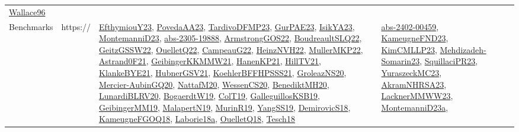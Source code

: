 {\begin{longtable}{llp{6cm}p{6cm}p{6cm}}
\href{articles/Wallace96.pdf}{Wallace96}\cite{Wallace96}\\
Benchmarks & https:// & \href{papers/EfthymiouY23.pdf}{EfthymiouY23}\cite{EfthymiouY23}, \href{papers/PovedaAA23.pdf}{PovedaAA23}\cite{PovedaAA23}, \href{papers/TardivoDFMP23.pdf}{TardivoDFMP23}\cite{TardivoDFMP23}, \href{articles/GurPAE23.pdf}{GurPAE23}\cite{GurPAE23}, \href{articles/IsikYA23.pdf}{IsikYA23}\cite{IsikYA23}, \href{articles/MontemanniD23.pdf}{MontemanniD23}\cite{MontemanniD23}, \href{articles/abs-2305-19888.pdf}{abs-2305-19888}\cite{abs-2305-19888}, \href{papers/ArmstrongGOS22.pdf}{ArmstrongGOS22}\cite{ArmstrongGOS22}, \href{papers/BoudreaultSLQ22.pdf}{BoudreaultSLQ22}\cite{BoudreaultSLQ22}, \href{papers/GeitzGSSW22.pdf}{GeitzGSSW22}\cite{GeitzGSSW22}, \href{papers/OuelletQ22.pdf}{OuelletQ22}\cite{OuelletQ22}, \href{articles/CampeauG22.pdf}{CampeauG22}\cite{CampeauG22}, \href{articles/HeinzNVH22.pdf}{HeinzNVH22}\cite{HeinzNVH22}, \href{articles/MullerMKP22.pdf}{MullerMKP22}\cite{MullerMKP22}, \href{papers/Astrand0F21.pdf}{Astrand0F21}\cite{Astrand0F21}, \href{papers/GeibingerKKMMW21.pdf}{GeibingerKKMMW21}\cite{GeibingerKKMMW21}, \href{papers/HanenKP21.pdf}{HanenKP21}\cite{HanenKP21}, \href{papers/HillTV21.pdf}{HillTV21}\cite{HillTV21}, \href{papers/KlankeBYE21.pdf}{KlankeBYE21}\cite{KlankeBYE21}, \href{articles/HubnerGSV21.pdf}{HubnerGSV21}\cite{HubnerGSV21}, \href{articles/KoehlerBFFHPSSS21.pdf}{KoehlerBFFHPSSS21}\cite{KoehlerBFFHPSSS21}, \href{papers/GroleazNS20.pdf}{GroleazNS20}\cite{GroleazNS20}, \href{papers/Mercier-AubinGQ20.pdf}{Mercier-AubinGQ20}\cite{Mercier-AubinGQ20}, \href{papers/NattafM20.pdf}{NattafM20}\cite{NattafM20}, \href{papers/WessenCS20.pdf}{WessenCS20}\cite{WessenCS20}, \href{articles/BenediktMH20.pdf}{BenediktMH20}\cite{BenediktMH20}, \href{articles/LunardiBLRV20.pdf}{LunardiBLRV20}\cite{LunardiBLRV20}, \href{papers/BogaerdtW19.pdf}{BogaerdtW19}\cite{BogaerdtW19}, \href{papers/ColT19.pdf}{ColT19}\cite{ColT19}, \href{papers/GalleguillosKSB19.pdf}{GalleguillosKSB19}\cite{GalleguillosKSB19}, \href{papers/GeibingerMM19.pdf}{GeibingerMM19}\cite{GeibingerMM19}, \href{papers/MalapertN19.pdf}{MalapertN19}\cite{MalapertN19}, \href{papers/MurinR19.pdf}{MurinR19}\cite{MurinR19}, \href{papers/YangSS19.pdf}{YangSS19}\cite{YangSS19}, \href{papers/DemirovicS18.pdf}{DemirovicS18}\cite{DemirovicS18}, \href{papers/KameugneFGOQ18.pdf}{KameugneFGOQ18}\cite{KameugneFGOQ18}, \href{papers/Laborie18a.pdf}{Laborie18a}\cite{Laborie18a}, \href{papers/OuelletQ18.pdf}{OuelletQ18}\cite{OuelletQ18}, \href{papers/Tesch18.pdf}{Tesch18}\cite{Tesch18} & \href{articles/abs-2402-00459.pdf}{abs-2402-00459}\cite{abs-2402-00459}, \href{papers/KameugneFND23.pdf}{KameugneFND23}\cite{KameugneFND23}, \href{papers/KimCMLLP23.pdf}{KimCMLLP23}\cite{KimCMLLP23}, \href{papers/Mehdizadeh-Somarin23.pdf}{Mehdizadeh-Somarin23}\cite{Mehdizadeh-Somarin23}, \href{papers/SquillaciPR23.pdf}{SquillaciPR23}\cite{SquillaciPR23}, \href{papers/YuraszeckMC23.pdf}{YuraszeckMC23}\cite{YuraszeckMC23}, \href{articles/AkramNHRSA23.pdf}{AkramNHRSA23}\cite{AkramNHRSA23}, \href{articles/LacknerMMWW23.pdf}{LacknerMMWW23}\cite{LacknerMMWW23}, \href{articles/MontemanniD23a.pdf}{MontemanniD23a}\cite{MontemanniD23a}, 
\end{longtable}}
